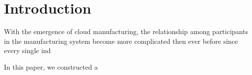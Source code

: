 \section{Introduction}
With the emergence of cloud manufacturing, the relationship among participants in the manufacturing system become more complicated then ever before since every single ind

In this paper, we constructed a 
